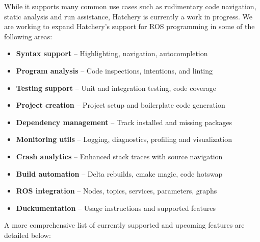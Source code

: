 \noindent While it supports many common use cases such as rudimentary code navigation, static analysis and run assistance, Hatchery is currently a work in progress. We are working to expand Hatchery's support for ROS programming in some of the following areas:\vspace{10pt}
%
\begin{itemize}
\item \textbf{Syntax support} -- Highlighting, navigation, autocompletion
\item \textbf{Program analysis} -- Code inspections, intentions, and linting
\item \textbf{Testing support} -- Unit and integration testing, code coverage
\item \textbf{Project creation} -- Project setup and boilerplate code generation
\item \textbf{Dependency management} -- Track installed and missing packages
\item \textbf{Monitoring utils} -- Logging, diagnostics, profiling and visualization
\item \textbf{Crash analytics} -- Enhanced stack traces with source navigation
\item \textbf{Build automation} -- Delta rebuilds, cmake magic, code hotswap
\item \textbf{ROS integration} -- Nodes, topics, services, parameters, graphs
\item \textbf{Duckumentation} -- Usage instructions and supported features
\end{itemize}\vspace{10pt}
%
A more comprehensive list of currently supported and upcoming features are detailed below:\vspace{10pt}
%
